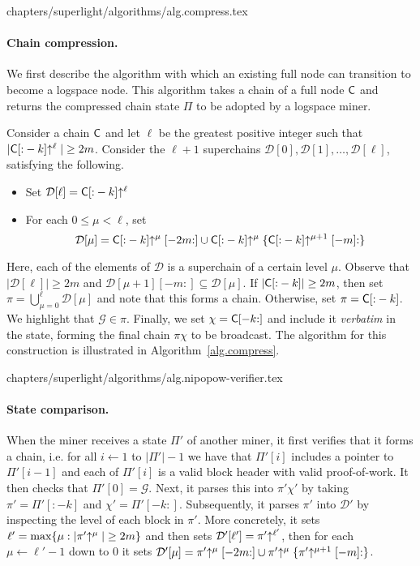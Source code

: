 {chapters/superlight/algorithms/alg.compress.tex}

\paragraph{Chain compression.}
We first describe the algorithm with which an existing full node can transition
to become a logspace node. This algorithm takes a chain of a full node $\mathsf{C}$
and returns the compressed chain state $\Pi$ to be adopted by a logspace
miner.

Consider a chain $\mathsf{C}$ and let $\ell$ be the greatest positive integer such
that $|\mathsf{C}[{:}-k]\negthickspace\uparrow^\ell| \geq 2m$.
Consider the $\ell+1$ superchains
$\mathcal{D}[0],\mathcal{D}[1],\dots,\mathcal{D}[\ell]$, satisfying the following.
\begin{itemize}
	\item
		Set
		$\mathcal{D}[\ell] = \mathsf{C}[{:}-k]\negthickspace\uparrow^\ell$
	\item
		For each $0\le\mu<\ell$, set
		\[
		\mathcal{D}[\mu] = \mathsf{C}[{:}-k]\negthickspace\uparrow^\mu[-2m{:}] \cup
		\mathsf{C}[{:}-k]\negthickspace\uparrow^\mu\{\mathsf{C}[{:}-k]\negthickspace\uparrow^{\mu+1}[-m]{:}\}
		\]
\end{itemize}

Here, each of the elements of $\mathcal{D}$ is a superchain of a certain level
$\mu$.
Observe that $|\mathcal{D}[\ell]| \geq 2m$ and $\mathcal{D}[\mu+1][-m:] \subseteq
\mathcal{D}[\mu]$. If $|\mathsf{C}[{:}-k]| \geq 2m$, then set $\pi = \bigcup_{\mu=0}^\ell
\mathcal{D}[\mu]$ and note that this forms a chain. Otherwise, set $\pi =
\mathsf{C}[{:}-k]$. We highlight that $\mathcal{G} \in \pi$. Finally, we set $\chi =
\mathsf{C}[-k{:}]$ and include it \emph{verbatim} in the state, forming the final chain
$\pi\chi$ to be broadcast. The algorithm for this construction is illustrated in
Algorithm~\ref{alg.compress}.

{chapters/superlight/algorithms/alg.nipopow-verifier.tex}

\paragraph{State comparison.}
When the miner receives a state $\Pi'$ of another miner, it first verifies that it forms a chain,
i.e. for all $i \gets 1$ to $|\Pi'| - 1$ we have that $\Pi'[i]$ includes a pointer to
$\Pi'[i - 1]$ and each of $\Pi'[i]$ is a valid block header with valid
proof-of-work. It then
checks that $\Pi'[0] = \mathcal{G}$. Next, it parses this into $\pi'\chi'$ by
taking $\pi' = \Pi'[{:}-k]$ and $\chi' = \Pi'[-k{:}]$. Subsequently, it
parses $\pi'$ into $\mathcal{D}'$ by inspecting the level of
each block in $\pi'$. More concretely, it sets
$\ell' = \max\{\mu: |\pi'\negthickspace\uparrow^\mu| \geq 2m\}$ and then
sets $\mathcal{D}'[\ell'] = \pi'\negthickspace\uparrow^{\ell'}$, then for each $\mu \gets \ell' - 1$ down
to $0$ it sets
$\mathcal{D}'[\mu] = \pi'\negthickspace\uparrow^\mu[-2m{:}]
          \cup \pi'\negthickspace\uparrow^\mu\{\pi'\negthickspace\uparrow^{\mu+1}[-m]{:}\}$.

